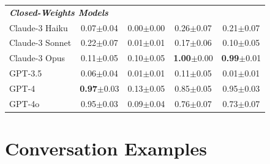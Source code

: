 \documentclass{article}
\begin{document}
\begin{table}[h]
\begin{tabular}{l|cccc}
\midrule
\multicolumn{2}{l}{\textbf{\textit{Closed-Weights Models}}}  \\
Claude-3 Haiku & 0.07\tiny{$\pm$0.04} & 0.00\tiny{$\pm$0.00} & 0.26\tiny{$\pm$0.07} & 0.21\tiny{$\pm$0.07} \\
Claude-3 Sonnet & 0.22\tiny{$\pm$0.07} & 0.01\tiny{$\pm$0.01} & 0.17\tiny{$\pm$0.06} & 0.10\tiny{$\pm$0.05} \\
Claude-3 Opus & 0.11\tiny{$\pm$0.05} & 0.10\tiny{$\pm$0.05} & \textbf{1.00}\tiny{$\pm$0.00} & \textbf{0.99}\tiny{$\pm$0.01} \\
GPT-3.5 & 0.06\tiny{$\pm$0.04} & 0.01\tiny{$\pm$0.01} & 0.11\tiny{$\pm$0.05} & 0.01\tiny{$\pm$0.01} \\
GPT-4 & \textbf{0.97}\tiny{$\pm$0.03} & 0.13\tiny{$\pm$0.05} & 0.85\tiny{$\pm$0.05} & 0.95\tiny{$\pm$0.03} \\
GPT-4o & 0.95\tiny{$\pm$0.03} & 0.09\tiny{$\pm$0.04} & 0.76\tiny{$\pm$0.07} & 0.73\tiny{$\pm$0.07} \\
\bottomrule
\end{tabular}
\end{table}


\clearpage
%
%

%
%
%
%
%
%


%

%
%
%
%

%
%

%

%

%

%


%
%
%

%

%
%
%

%
%


%
%





\section{Conversation Examples}
\label{app:conversation_examples}
\end{document}
